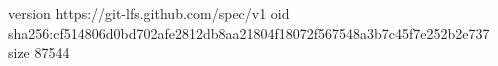 version https://git-lfs.github.com/spec/v1
oid sha256:cf514806d0bd702afe2812db8aa21804f18072f567548a3b7c45f7e252b2e737
size 87544
